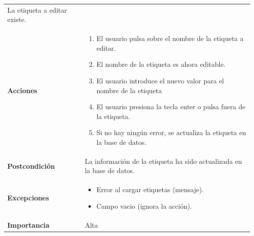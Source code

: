 \documentclass[
]{article}
\providecommand{\tightlist}{%
  \setlength{\itemsep}{0pt}\setlength{\parskip}{0pt}}
\begin{document}
\begin{longtable}[]{@{}ll@{}}
\begin{minipage}[t]{0.70\columnwidth}
La etiqueta a editar existe.\strut
\end{minipage}\tabularnewline
\begin{minipage}[t]{0.24\columnwidth}\raggedright
\textbf{Acciones}\strut
\end{minipage} & \begin{minipage}[t]{0.70\columnwidth}\raggedright
\begin{enumerate}
\def\labelenumi{\arabic{enumi}.}
\tightlist
\item
  El usuario pulsa sobre el nombre de la etiqueta a editar.
\item
  El nombre de la etiqueta es ahora editable.
\item
  El usuario introduce el nuevo valor para el nombre de la etiqueta
\item
  El usuario presiona la tecla enter o pulsa fuera de la etiqueta.
\item
  Si no hay ningún error, se actualiza la etiqueta en la base de datos.
\end{enumerate}\strut
\end{minipage}\tabularnewline
\begin{minipage}[t]{0.24\columnwidth}\raggedright
\textbf{Postcondición}\strut
\end{minipage} & \begin{minipage}[t]{0.70\columnwidth}\raggedright
La información de la etiqueta ha sido actualizada en la base de
datos.\strut
\end{minipage}\tabularnewline
\begin{minipage}[t]{0.24\columnwidth}\raggedright
\textbf{Excepciones}\strut
\end{minipage} & \begin{minipage}[t]{0.70\columnwidth}\raggedright
\begin{itemize}
\tightlist
\item
  Error al cargar etiquetas (mensaje).
\item
  Campo vacio (ignora la acción).
\end{itemize}\strut
\end{minipage}\tabularnewline
\begin{minipage}[t]{0.24\columnwidth}\raggedright
\textbf{Importancia}\strut
\end{minipage} & \begin{minipage}[t]{0.70\columnwidth}\raggedright
Alta\strut
\end{minipage}\tabularnewline
\bottomrule
\end{longtable}
\end{document}
